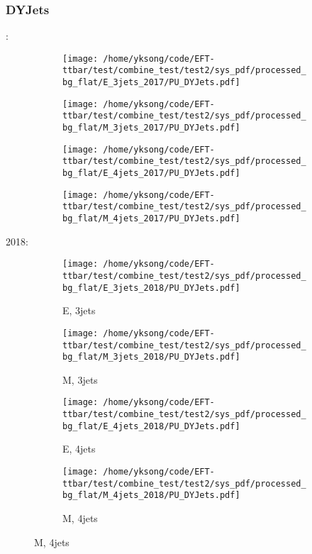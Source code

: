 \documentclass{beamer}
\begin{document}
\begin{frame}
\frametitle{DYJets}
\fontsize{5}{1}:
\begin{figure}
\centering
\begin{subfigure}[b]{0.24\textwidth}
\texttt{[image: /home/yksong/code/EFT-ttbar/test/combine\_test/test2/sys\_pdf/processed\_bg\_flat/E\_3jets\_2017/PU\_DYJets.pdf]}
\end{subfigure}
\begin{subfigure}[b]{0.24\textwidth}
\texttt{[image: /home/yksong/code/EFT-ttbar/test/combine\_test/test2/sys\_pdf/processed\_bg\_flat/M\_3jets\_2017/PU\_DYJets.pdf]}
\end{subfigure}
\begin{subfigure}[b]{0.24\textwidth}
\texttt{[image: /home/yksong/code/EFT-ttbar/test/combine\_test/test2/sys\_pdf/processed\_bg\_flat/E\_4jets\_2017/PU\_DYJets.pdf]}
\end{subfigure}
\begin{subfigure}[b]{0.24\textwidth}
\texttt{[image: /home/yksong/code/EFT-ttbar/test/combine\_test/test2/sys\_pdf/processed\_bg\_flat/M\_4jets\_2017/PU\_DYJets.pdf]}
\end{subfigure}
\end{figure}
2018:
\begin{figure}
\centering
\begin{subfigure}[b]{0.24\textwidth}
\texttt{[image: /home/yksong/code/EFT-ttbar/test/combine\_test/test2/sys\_pdf/processed\_bg\_flat/E\_3jets\_2018/PU\_DYJets.pdf]}
\captionsetup{font=tiny}
\caption{E, 3jets}
\end{subfigure}
\begin{subfigure}[b]{0.24\textwidth}
\texttt{[image: /home/yksong/code/EFT-ttbar/test/combine\_test/test2/sys\_pdf/processed\_bg\_flat/M\_3jets\_2018/PU\_DYJets.pdf]}
\captionsetup{font=tiny}
\caption{M, 3jets}
\end{subfigure}
\begin{subfigure}[b]{0.24\textwidth}
\texttt{[image: /home/yksong/code/EFT-ttbar/test/combine\_test/test2/sys\_pdf/processed\_bg\_flat/E\_4jets\_2018/PU\_DYJets.pdf]}
\captionsetup{font=tiny}
\caption{E, 4jets}
\end{subfigure}
\begin{subfigure}[b]{0.24\textwidth}
\texttt{[image: /home/yksong/code/EFT-ttbar/test/combine\_test/test2/sys\_pdf/processed\_bg\_flat/M\_4jets\_2018/PU\_DYJets.pdf]}
\captionsetup{font=tiny}
\caption{M, 4jets}
\end{subfigure}
\end{figure}
\end{frame}
\end{document}
